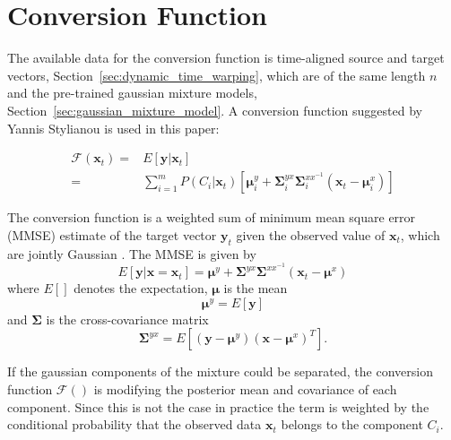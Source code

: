 \section{Conversion Function} %
\label{sec:conversion_function}
The available data for the conversion function is time-aligned source and target vectors, Section~\ref{sec:dynamic_time_warping}, which are of the same length $n$ and the pre-trained gaussian mixture models, Section~\ref{sec:gaussian_mixture_model}. A conversion function suggested by Yannis Stylianou \cite{stylianou95} is used in this paper:
\begin{defn}
	\label{defn:conversion_function}
	\begin{equation}
		\label{eq:conversion_function}
		\begin{split}
		\mathcal{F}(\mathbf{x}_t) =& E[\mathbf{y}\vert \mathbf{x}_t]\\
		 =& \sum_{i=1}^{m}P(C_i \vert \mathbf{x}_t)[\boldsymbol{\mu}_i^y + \mathbf{\Sigma}_i^{yx} \mathbf{\Sigma}_i^{xx^{-1}} (\mathbf{x}_t-\boldsymbol{\mu}_i^x)]
		\end{split}
	\end{equation}	
\end{defn}
The conversion function is a weighted sum of minimum mean square error (MMSE) estimate of the target vector $\mathbf{y}_t$ given the observed value of $\mathbf{x}_t$, which are jointly Gaussian \cite{stylianou98}. The MMSE is given by \cite{taletek}
\begin{equation}
	\label{eq:mmse}
	E[\mathbf{y}\vert \mathbf{x}=\mathbf{x}_t] = \boldsymbol{\mu}^y + \mathbf{\Sigma}^{yx} \mathbf{\Sigma}^{xx^{-1}} (\mathbf{x}_t-\boldsymbol{\mu}^x)
\end{equation}
where $E[]$ denotes the expectation, $\boldsymbol{\mu}$ is the mean
\begin{equation}
	\boldsymbol{\mu}^y = E[\mathbf{y}]
\end{equation}
and $\mathbf{\Sigma}$ is the cross-covariance matrix
\begin{equation}
	\mathbf{\Sigma}^{yx} = E[(\mathbf{y}-\boldsymbol{\mu}^y)(\mathbf{x}-\boldsymbol{\mu}^x)^T].
\end{equation}

If the gaussian components of the mixture could be separated, the conversion function $\mathcal{F}()$ is modifying the posterior mean and covariance of each component. Since this is not the case in practice the term is weighted by the conditional probability that the observed data $\mathbf{x}_t$ belongs to the component $C_i$.

